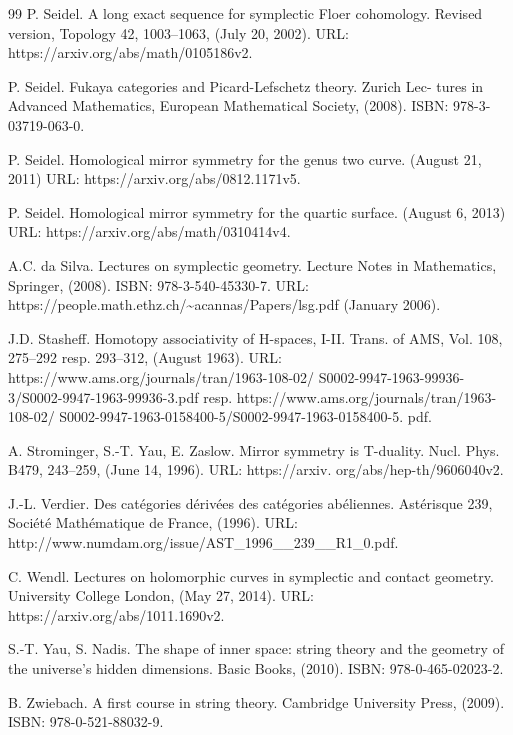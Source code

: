 \begin{thebibliography}{99}
 P. Seidel. A long exact sequence for symplectic Floer cohomology. Revised version, Topology 42, 1003–1063, (July 20, 2002). URL: https://arxiv.org/abs/math/0105186v2.

 P. Seidel. Fukaya categories and Picard-Lefschetz theory. Zurich Lec- tures in Advanced Mathematics, European Mathematical Society, (2008). ISBN: 978-3-03719-063-0.

 P. Seidel. Homological mirror symmetry for the genus two curve. (August 21, 2011) URL: https://arxiv.org/abs/0812.1171v5.

 P. Seidel. Homological mirror symmetry for the quartic surface. (August 6, 2013) URL: https://arxiv.org/abs/math/0310414v4.

 A.C. da Silva. Lectures on symplectic geometry. Lecture Notes in Mathematics, Springer, (2008). ISBN: 978-3-540-45330-7. URL: https://people.math.ethz.ch/\textasciitilde{}acannas/Papers/lsg.pdf (January 2006).

 J.D. Stasheff. Homotopy associativity of H-spaces, I-II. Trans. of AMS, Vol. 108, 275–292 resp. 293–312, (August 1963). URL: https://www.ams.org/journals/tran/1963-108-02/ S0002-9947-1963-99936-3/S0002-9947-1963-99936-3.pdf resp. https://www.ams.org/journals/tran/1963-108-02/ S0002-9947-1963-0158400-5/S0002-9947-1963-0158400-5. pdf.

 A. Strominger, S.-T. Yau, E. Zaslow. Mirror symmetry is T-duality. Nucl. Phys. B479, 243–259, (June 14, 1996). URL: https://arxiv. org/abs/hep-th/9606040v2.

 J.-L. Verdier. Des catégories dérivées des catégories abéliennes. Astérisque 239, Société Mathématique de France, (1996). URL: http://www.numdam.org/issue/AST\_1996\_\_239\_\_R1\_0.pdf.

 C. Wendl. Lectures on holomorphic curves in symplectic and contact geometry. University College London, (May 27, 2014). URL: https://arxiv.org/abs/1011.1690v2.

 S.-T. Yau, S. Nadis. The shape of inner space: string theory and the geometry of the universe’s hidden dimensions. Basic Books, (2010). ISBN: 978-0-465-02023-2.

 B. Zwiebach. A first course in string theory. Cambridge University Press, (2009). ISBN: 978-0-521-88032-9.

\end{thebibliography}